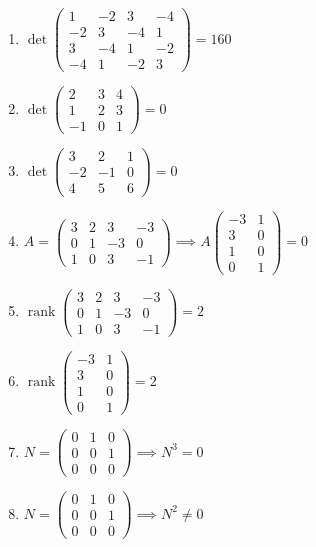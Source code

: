 \documentclass[11pt,a4paper]{article}
\begin{document}
\begin{enumerate}
\item $\displaystyle \det \begin{pmatrix} 1 & -2 & 3 & -4 \\ -2 & 3 & -4 & 1 \\ 3 & -4 & 1 & -2 \\ -4 & 1 & -2 & 3 \end{pmatrix} = 160$
\item $\displaystyle \det \begin{pmatrix} 2 & 3 & 4 \\ 1 & 2 & 3 \\ -1 & 0 & 1 \end{pmatrix} = 0$
\item $\displaystyle \det \begin{pmatrix} 3 & 2 & 1 \\ -2 & -1 & 0 \\ 4 & 5 & 6 \end{pmatrix} = 0$
\item $\displaystyle A = \begin{pmatrix} 3 & 2 & 3 & -3 \\ 0 & 1 & -3 & 0 \\ 1 & 0 & 3 & -1 \end{pmatrix} \implies A \begin{pmatrix} -3 & 1 \\ 3 & 0 \\ 1 & 0 \\ 0 & 1 \end{pmatrix} = 0$
\item $\displaystyle \operatorname{rank} \begin{pmatrix} 3 & 2 & 3 & -3 \\ 0 & 1 & -3 & 0 \\ 1 & 0 & 3 & -1 \end{pmatrix} = 2$
\item $\displaystyle \operatorname{rank} \begin{pmatrix} -3 & 1 \\ 3 & 0 \\ 1 & 0 \\ 0 & 1 \end{pmatrix} = 2$
\item $\displaystyle N = \begin{pmatrix} 0 & 1 & 0 \\ 0 & 0 & 1 \\ 0 & 0 & 0 \end{pmatrix} \implies N^{3} = 0$
\item $\displaystyle N = \begin{pmatrix} 0 & 1 & 0 \\ 0 & 0 & 1 \\ 0 & 0 & 0 \end{pmatrix} \implies N^{2} \neq 0$

\end{enumerate}
\end{document}
